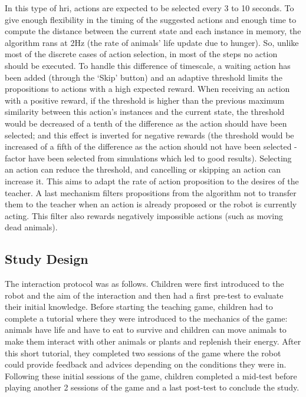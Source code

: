 In this type of \gls{hri}, actions are expected to be selected every 3 to 10 seconds. To give enough flexibility in the timing of the suggested actions and enough time to compute the distance between the current state and each instance in memory, the algorithm rans at 2Hz (the rate of animals' life update due to hunger). So, unlike most of the discrete cases of action selection, in most of the steps no action should be executed. To handle this difference of timescale, a waiting action has been added (through the `Skip' button) and an adaptive threshold limits the propositions to actions with a high expected reward. When receiving an action with a positive reward, if the threshold is higher than the previous maximum similarity between this action's instances and the current state, the threshold would be decreased of a tenth of the difference as the action should have been selected; and this effect is inverted for negative rewards (the threshold would be increased of a fifth of the difference as the action should not have been selected - factor have been selected from simulations which led to good results). Selecting an action can reduce the threshold, and cancelling or skipping an action can increase it. This aims to adapt the rate of action proposition to the desires of the teacher. A last mechanism filters propositions from the algorithm not to transfer them to the teacher when an action is already proposed or the robot is currently acting. This filter also rewards negatively impossible actions (such as moving dead animals).

\subsection{Study Design}

The interaction protocol was as follows. Children were first introduced to the robot and the aim of the interaction and then had a first pre-test to evaluate their initial knowledge. Before starting the teaching game, children had to complete a tutorial where they were introduced to the mechanics of the game: animals have life and have to eat to survive and children can move animals to make them interact with other animals or plants and replenish their energy. After this short tutorial, they completed two sessions of the game where the robot could provide feedback and advices depending on the conditions they were in. Following these initial sessions of the game, children completed a mid-test before playing another 2 sessions of the game and a last post-test to conclude the study. 

